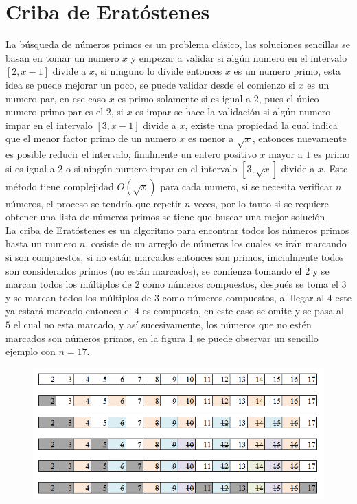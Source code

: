 \documentclass[12pt, a4paper]{article}
\begin{document}
	\section{Criba de Eratóstenes}
	\label{matematicas:criba_de_eratostenes}
	
	La búsqueda de números primos es un problema clásico, las soluciones sencillas se basan en tomar un numero $x$
	y empezar a validar si algún numero en el intervalo $[2, x-1]$ divide a $x$, si ninguno lo divide entonces $x$ es
	un numero primo, esta idea se puede mejorar un poco, se puede validar desde el comienzo si $x$ es un numero par, en
	ese caso $x$ es primo solamente si es igual a $2$, pues el único numero primo par es el $2$, si $x$ es impar se 
	hace la validación si algún numero impar en el intervalo $[3, x-1]$ divide a $x$, existe una propiedad la cual
	indica que el menor factor primo de un numero $x$ es menor a $\sqrt{x}$, entonces nuevamente es posible reducir 
	el intervalo, finalmente un entero positivo $x$ mayor a $1$ es primo si es igual a $2$ o si ningún numero impar
	en el intervalo $[3, \sqrt{x}]$ divide a $x$. Este método tiene complejidad $O(\sqrt{x})$ para cada numero, si 
	se necesita	verificar $n$ números, el proceso se tendría que repetir $n$ veces, por lo tanto si se requiere 
	obtener una lista de números primos se tiene que buscar una mejor solución\\
	
	La criba de Eratóstenes es un algoritmo para encontrar todos los números primos hasta un numero $n$, cosiste de un
	arreglo de números los cuales se irán marcando si son compuestos, si no están marcados entonces son primos,
	inicialmente todos son considerados primos (no están marcados), 
	se comienza tomando el $2$ y se marcan todos los múltiplos de $2$ como números compuestos, después se toma el $3$ 
	y se marcan todos los múltiplos de $3$ como números compuestos, al llegar al $4$ este ya estará marcado entonces el
	$4$ es compuesto, en este caso se omite y se pasa al $5$ el cual no esta marcado, y así sucesivamente, los números
	que no estén marcados son números primos, en la figura \ref{matematicas:criba_de_eratostenes:ejemplo}
	se puede observar un sencillo ejemplo con $n = 17$.\\
	
	\begin{figure}[!htb]
		\centering
		\includegraphics[scale=0.9]{Matematicas/imagenes/criba_de_eratostenes/ejemplo}
		\caption{}
		\label{matematicas:criba_de_eratostenes:ejemplo}
	\end{figure}
	
\end{document}
